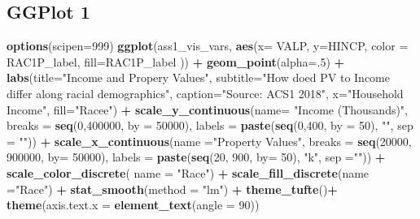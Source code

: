 \documentclass[
]{article}
\newenvironment{Shaded}{\begin{snugshade}}{\end{snugshade}}
\newcommand{\DataTypeTok}[1]{\textcolor[rgb]{0.13,0.29,0.53}{#1}}
\newcommand{\DecValTok}[1]{\textcolor[rgb]{0.00,0.00,0.81}{#1}}
\newcommand{\KeywordTok}[1]{\textcolor[rgb]{0.13,0.29,0.53}{\textbf{#1}}}
\newcommand{\NormalTok}[1]{#1}
\newcommand{\OperatorTok}[1]{\textcolor[rgb]{0.81,0.36,0.00}{\textbf{#1}}}
\newcommand{\StringTok}[1]{\textcolor[rgb]{0.31,0.60,0.02}{#1}}
\begin{document}
\hypertarget{ggplot-1}{%
\subsection{GGPlot 1}\label{ggplot-1}}

\begin{Shaded}
\begin{Highlighting}[]
\KeywordTok{options}\NormalTok{(}\DataTypeTok{scipen=}\DecValTok{999}\NormalTok{)}
\KeywordTok{ggplot}\NormalTok{(ass1_vis_vars, }\KeywordTok{aes}\NormalTok{(}\DataTypeTok{x=}\NormalTok{ VALP, }\DataTypeTok{y=}\NormalTok{HINCP, }\DataTypeTok{color =}\NormalTok{ RAC1P_label, }\DataTypeTok{fill=}\NormalTok{RAC1P_label )) }\OperatorTok{+}
\KeywordTok{geom_point}\NormalTok{(}\DataTypeTok{alpha=}\NormalTok{.}\DecValTok{5}\NormalTok{) }\OperatorTok{+}
\StringTok{  }\KeywordTok{labs}\NormalTok{(}\DataTypeTok{title=}\StringTok{"Income and Propery Values"}\NormalTok{, }
         \DataTypeTok{subtitle=}\StringTok{"How doed PV to Income differ along racial demographics"}\NormalTok{,}
         \DataTypeTok{caption=}\StringTok{"Source: ACS1 2018"}\NormalTok{,}
         \DataTypeTok{x=}\StringTok{"Household Income"}\NormalTok{,}
         \DataTypeTok{fill=}\StringTok{"Racee"}\NormalTok{)  }\OperatorTok{+}
\StringTok{  }\KeywordTok{scale_y_continuous}\NormalTok{(}\DataTypeTok{name=} \StringTok{"Income (Thousands)"}\NormalTok{,}
                     \DataTypeTok{breaks =} \KeywordTok{seq}\NormalTok{(}\DecValTok{0}\NormalTok{,}\DecValTok{400000}\NormalTok{, }\DataTypeTok{by =} \DecValTok{50000}\NormalTok{),}
                     \DataTypeTok{labels =} \KeywordTok{paste}\NormalTok{(}\KeywordTok{seq}\NormalTok{(}\DecValTok{0}\NormalTok{,}\DecValTok{400}\NormalTok{, }\DataTypeTok{by =} \DecValTok{50}\NormalTok{),}
                     \StringTok{""}\NormalTok{, }\DataTypeTok{sep =} \StringTok{""}\NormalTok{)) }\OperatorTok{+}
\StringTok{  }\KeywordTok{scale_x_continuous}\NormalTok{(}\DataTypeTok{name =}\StringTok{"Property Values"}\NormalTok{,}
                     \DataTypeTok{breaks =} \KeywordTok{seq}\NormalTok{(}\DecValTok{20000}\NormalTok{, }\DecValTok{900000}\NormalTok{, }\DataTypeTok{by=} \DecValTok{50000}\NormalTok{),}
                     \DataTypeTok{labels =} \KeywordTok{paste}\NormalTok{(}\KeywordTok{seq}\NormalTok{(}\DecValTok{20}\NormalTok{, }\DecValTok{900}\NormalTok{, }\DataTypeTok{by=} \DecValTok{50}\NormalTok{),}
                                    \StringTok{"k"}\NormalTok{, }\DataTypeTok{sep =}\StringTok{""}\NormalTok{)) }\OperatorTok{+}
\StringTok{  }\KeywordTok{scale_color_discrete}\NormalTok{( }\DataTypeTok{name =} \StringTok{"Race"}\NormalTok{) }\OperatorTok{+}\StringTok{ }
\StringTok{  }\KeywordTok{scale_fill_discrete}\NormalTok{(}\DataTypeTok{name =}\StringTok{"Race"}\NormalTok{) }\OperatorTok{+}
\StringTok{  }\KeywordTok{stat_smooth}\NormalTok{(}\DataTypeTok{method =} \StringTok{"lm"}\NormalTok{) }\OperatorTok{+}
\StringTok{  }\KeywordTok{theme_tufte}\NormalTok{()}\OperatorTok{+}
\StringTok{  }\KeywordTok{theme}\NormalTok{(}\DataTypeTok{axis.text.x =} \KeywordTok{element_text}\NormalTok{(}\DataTypeTok{angle =} \DecValTok{90}\NormalTok{))}
\end{Highlighting}
\end{Shaded}
\end{document}
